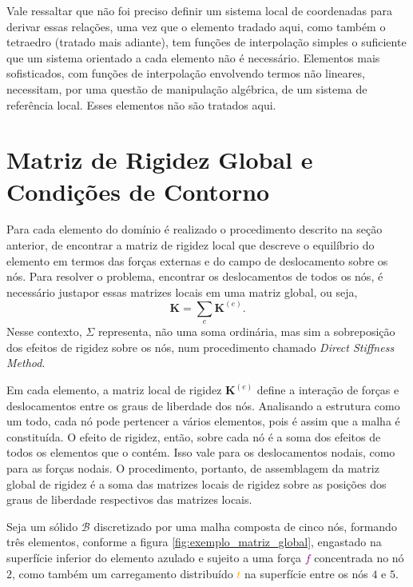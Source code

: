 Vale ressaltar que não foi preciso definir um sistema local de coordenadas para derivar essas relações, uma vez que o elemento tradado aqui, como também o tetraedro (tratado mais adiante), tem funções de interpolação simples o suficiente que um sistema orientado a cada elemento não é necessário. Elementos mais sofisticados, com funções de interpolação envolvendo termos não lineares, necessitam, por uma questão de manipulação algébrica, de um sistema de referência local. Esses elementos não são tratados aqui.

\section{Matriz de Rigidez Global e Condições de Contorno}

Para cada elemento do domínio é realizado o procedimento descrito na seção anterior, de encontrar a matriz de rigidez local que descreve o equilíbrio do elemento em termos das forças externas e do campo de deslocamento sobre os nós. Para resolver o problema, encontrar os deslocamentos de todos os nós, é necessário justapor essas matrizes locais em uma matriz global, ou seja,
\begin{equation}
    \bm{K} = \sum_{e} \bm{K}^{(e)}.
\end{equation}
Nesse contexto, $\Sigma$ representa, não uma soma ordinária, mas sim a sobreposição dos efeitos de rigidez sobre os nós, num procedimento chamado \emph{Direct Stiffness Method}.  \cite{LOGAN}

Em cada elemento, a matriz local de rigidez $\bm{K}^{(e)}$ define a interação de forças e deslocamentos entre os graus de liberdade dos nós. Analisando a estrutura como um todo, cada nó pode pertencer a vários elementos, pois é assim que a malha é constituída. O efeito de rigidez, então, sobre cada nó é a soma dos efeitos de todos os elementos que o contém. Isso vale para os deslocamentos nodais, como para as forças nodais. O procedimento, portanto, de assemblagem da matriz global de rigidez é a soma das matrizes locais de rigidez sobre as posições dos graus de liberdade respectivos das matrizes locais.



Seja um sólido $\mathcal{B}$ discretizado por uma malha composta de cinco nós, formando três elementos, conforme a figura \ref{fig:exemplo_matriz_global}, engastado na superfície inferior do elemento azulado e sujeito a uma força \textcolor{purple}{$f$} concentrada no nó $2$, como também um carregamento distribuído \textcolor{orange}{$t$} na superfície entre os nós $4$ e $5$.

